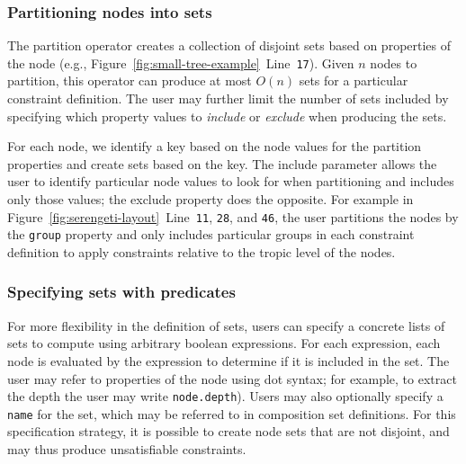 \subsubsection{Partitioning nodes into sets}
The partition operator creates a collection of disjoint sets based on
properties of the node (e.g., Figure~\ref{fig:small-tree-example}~Line~\texttt{17}).
Given $n$ nodes to partition, this operator can produce at most $O(n)$ 
sets for a particular constraint definition. The user may further limit 
the number of sets  included by specifying which property values to 
\emph{include} or \emph{exclude} when producing the sets.

For each node, we identify a key based on the node values for the partition
properties and create sets based on the key. The include parameter allows
the user to identify particular node values to look for when partitioning
and includes only those values; the exclude property does the opposite. 
For example in Figure~\ref{fig:serengeti-layout}~Line~\texttt{11}, \texttt{28},
and \texttt{46}, the user partitions the nodes by the \texttt{group} property
and only includes particular groups in each constraint definition to apply
constraints relative to the tropic level of the nodes.

\subsubsection{Specifying sets with predicates}
For more flexibility in the definition of sets, users
can specify a concrete lists of sets to compute using arbitrary boolean
expressions. For each expression, each node is evaluated by the expression
to determine if it is included in the set. The user may
refer to properties of the node using dot syntax; for example, to extract
the depth the user may write \texttt{node.depth}). Users may also optionally specify a
\texttt{name} for the set, which may be referred to in composition set
definitions. For this specification strategy, it is possible to create
node sets that are not disjoint, and may thus produce unsatisfiable
constraints.



